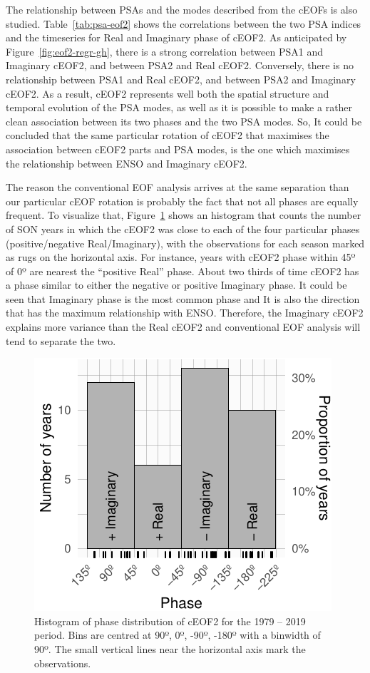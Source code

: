 \documentclass[smallextended]{svjour3}       %
\begin{document}
The relationship between PSAs and the modes described from the cEOFs is also studied.
Table~\ref{tab:psa-eof2} shows the correlations between the two PSA indices and the timeseries for Real and Imaginary phase of cEOF2.
As anticipated by Figure~\ref{fig:eof2-regr-gh}, there is a strong correlation between PSA1 and Imaginary cEOF2, and between PSA2 and Real cEOF2.
Conversely, there is no relationship between PSA1 and Real cEOF2, and between PSA2 and Imaginary cEOF2.
As a result, cEOF2 represents well both the spatial structure and temporal evolution of the PSA modes, as well as it is possible to make a rather clean association between its two phases and the two PSA modes.
So, It could be concluded that the same particular rotation of cEOF2 that maximises the association between cEOF2 parts and PSA modes, is the one which maximises the relationship between ENSO and Imaginary cEOF2.

The reason the conventional EOF analysis arrives at the same separation than our particular cEOF rotation is probably the fact that not all phases are equally frequent.
To visualize that, Figure~\ref{fig:phase-histogram} shows an histogram that counts the number of SON years in which the cEOF2 was close to each of the four particular phases (positive/negative Real/Imaginary), with the observations for each season marked as rugs on the horizontal axis.
For instance, years with cEOF2 phase within 45º of 0º are nearest the ``positive Real'' phase.
About two thirds of time cEOF2 has a phase similar to either the negative or positive Imaginary phase.
It could be seen that Imaginary phase is the most common phase and It is also the direction that has the maximum relationship with ENSO.
Therefore, the Imaginary cEOF2 explains more variance than the Real cEOF2 and conventional EOF analysis will tend to separate the two.



\begin{figure}
\centering
\includegraphics{../figures/phase-histogram-1.pdf}
\caption{\label{fig:phase-histogram}Histogram of phase distribution of cEOF2 for the 1979 -- 2019 period. Bins are centred at 90º, 0º, -90º, -180º with a binwidth of 90º. The small vertical lines near the horizontal axis mark the observations.}
\end{figure}
\end{document}
